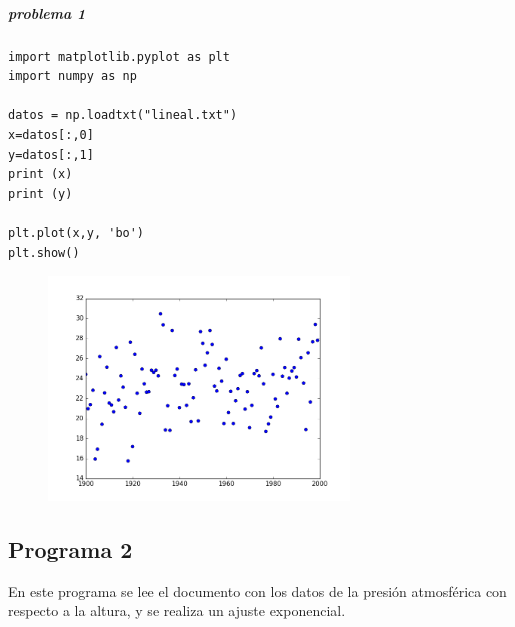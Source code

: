 \documentclass[12pt]{article}
\begin{document}
\subparagraph{problema 1}
\begin{verbatim}
import matplotlib.pyplot as plt 
import numpy as np

datos = np.loadtxt("lineal.txt")
x=datos[:,0]
y=datos[:,1]
print (x)
print (y)

plt.plot(x,y, 'bo')
plt.show()
\end{verbatim}
\begin{figure}[H]
	\centering
	\includegraphics[width=8cm]{figure_1.png}
\end{figure}

\subsection{Programa 2}
En este programa se lee el documento con los datos de la presión atmosférica con respecto a la altura, y se realiza un ajuste exponencial.
\end{document}

